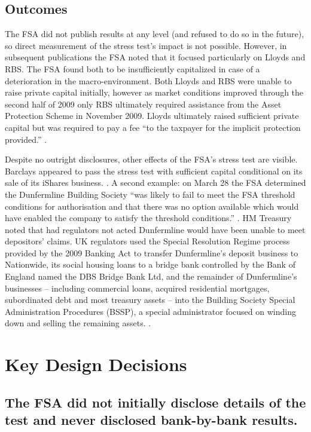\documentclass[12pt]{article}
\begin{document}
\subsection{Outcomes}

The FSA did not publish results at any level (and refused to do so in the future), so direct measurement of the stress test's impact is not possible. However, in subsequent publications the FSA noted that it focused particularly on Lloyds and RBS. The FSA found both to be insufficiently capitalized in case of a deterioration in the macro-environment. Both Lloyds and RBS were unable to raise private capital initially, however as market conditions improved through the second half of 2009 only RBS ultimately required assistance from the Asset Protection Scheme in November 2009. Lloyds ultimately raised sufficient private capital but was required to pay a fee ``to the taxpayer for the implicit protection provided.'' \citep{FSAReport}.

Despite no outright disclosures, other effects of the FSA's stress test are visible. Barclays appeared to pass the stress test with sufficient capital conditional on its sale of its iShares business. \citep{Barclays1}. A second example: on March 28 the FSA determined the Dunfermline Building Society ``was likely to fail to meet the FSA threshold conditions for authorisation and that there was no option available which would have enabled the company to satisfy the threshold conditions.'' \citep{ DunfermlinePress}. HM Treasury noted that had regulators not acted Dunfermline would have been unable to meet depositors' claims. UK regulators used the Special Resolution Regime process provided by the 2009 Banking Act to transfer Dunfermline's deposit business to Nationwide, its social housing loans to a bridge bank controlled by the Bank of England named the DBS Bridge Bank Ltd, and the remainder of  Dunfermline's businesses -- including commercial loans, acquired residential mortgages, subordinated debt and most treasury assets -- into the Building Society Special Administration Procedures (BSSP), a special administrator focused on winding down and selling the remaining assets. \citep{ DunfermlinePress}.

\section{Key Design Decisions}\label{keydesign}

\subsection{The FSA did not initially disclose details of the test and never disclosed bank-by-bank results.}
\end{document}

